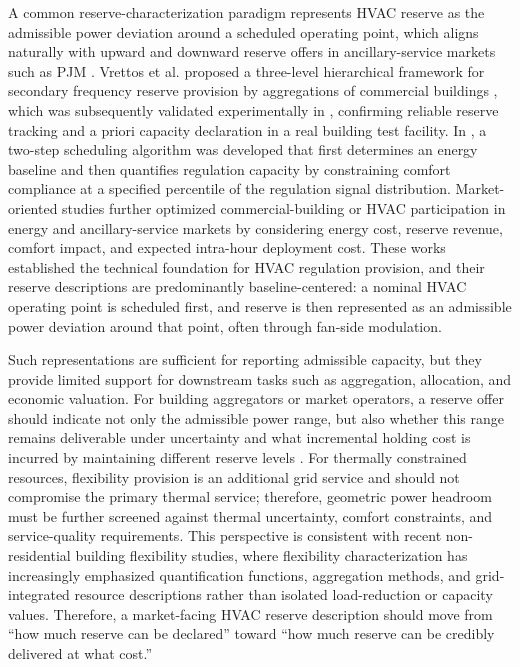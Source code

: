 \documentclass[journal]{IEEEtran}
\theoremstyle{remark}
\begin{document}
A common reserve-characterization paradigm represents HVAC reserve as the admissible power deviation around a scheduled operating point, which aligns naturally with upward and downward reserve offers in ancillary-service markets such as PJM \cite{pjm2021manual11}. Vrettos et al. proposed a three-level hierarchical framework for secondary frequency reserve provision by aggregations of commercial buildings \cite{vrettos2015scheduling}, which was subsequently validated experimentally in \cite{vrettos2016experimental, vrettos2016experimental2}, confirming reliable reserve tracking and a priori capacity declaration in a real building test facility. In \cite{liu2017evaluation}, a two-step scheduling algorithm was developed that first determines an energy baseline and then quantifies regulation capacity by constraining comfort compliance at a specified percentile of the regulation signal distribution. Market-oriented studies further optimized commercial-building or HVAC participation in energy and ancillary-service markets by considering energy cost, reserve revenue, comfort impact, and expected intra-hour deployment cost\cite{aslam2023optimal}. These works established the technical foundation for HVAC regulation provision, and their reserve descriptions are predominantly baseline-centered: a nominal HVAC operating point is scheduled first, and reserve is then represented as an admissible power deviation around that point, often through fan-side modulation.

Such representations are sufficient for reporting admissible capacity, but they provide limited support for downstream tasks such as aggregation, allocation, and economic valuation. For building aggregators or market operators, a reserve offer should indicate not only the admissible power range, but also whether this range remains deliverable under uncertainty\cite{liu2024continuous} and what incremental holding cost is incurred by maintaining different reserve levels \cite{chen2024aggregating}. For thermally constrained resources, flexibility provision is an additional grid service and should not compromise the primary thermal service; therefore, geometric power headroom must be further screened against thermal uncertainty, comfort constraints, and service-quality requirements\cite{maitanova2024analytical}. This perspective is consistent with recent non-residential building flexibility studies, where flexibility characterization has increasingly emphasized quantification functions, aggregation methods, and grid-integrated resource descriptions rather than isolated load-reduction or capacity values\cite{zhou2025demand}. Therefore, a market-facing HVAC reserve description should move from “how much reserve can be declared” toward “how much reserve can be credibly delivered at what cost.” 
\end{document}
